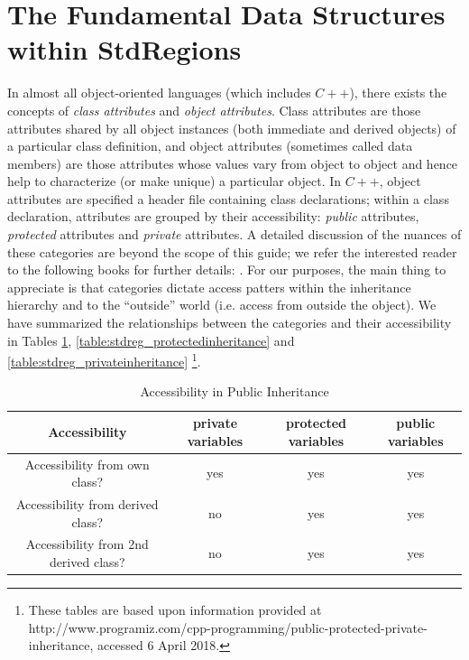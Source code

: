 %
\section{The Fundamental Data Structures within StdRegions}
\label{sec:stdregions-datastructures}

In almost all object-oriented languages (which includes $C++$), there exists the concepts of {\em class attributes} and {\em object attributes}.  Class attributes are those attributes shared by all object instances (both immediate and derived objects) of a particular class definition, and object attributes (sometimes called data members) are those attributes whose values vary from object to object and hence help to characterize (or make unique) a particular object. In $C++$, object attributes are specified a header file containing class declarations; within a class declaration, attributes are grouped by their accessibility: {\em public} attributes, {\em protected} attributes and {\em private} attributes.  A detailed discussion of the nuances of these
categories are beyond the scope of this guide; we refer the interested reader to the following books for further details:  \cite{BStroustrup,SMeyers}.
For our purposes, the main thing to appreciate is that categories dictate access patters within the inheritance hierarchy and to the ``outside'' world 
(i.e. access from outside the object).  We have summarized the relationships between the categories and their accessibility in Tables
\ref{table:stdreg_publicinheritance}, \ref{table:stdreg_protectedinheritance} and \ref{table:stdreg_privateinheritance} \footnote{These tables are based upon information provided at http://www.programiz.com/cpp-programming/public-protected-private-inheritance, accessed 6 April 2018.}.


\begin{table}[ht]
\begin{center}
\caption{Accessibility in Public Inheritance}
\label{table:stdreg_publicinheritance}
\begin{tabular}{c c c c}
\hline\hline
Accessibility & private variables & protected variables & public variables \\
\hline
Accessibility from own class? & yes & yes & yes \\
Accessibility from derived class? & no & yes & yes\\
Accessibility from 2nd derived class? & no & yes & yes\\
\end{tabular}
\end{center}
\end{table}

